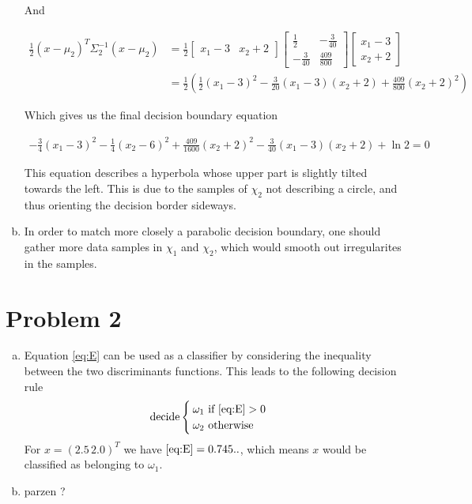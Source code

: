 \documentclass[a4paper, 10pt, twoside]{article}
\begin{document}
\begin{enumerate}[a)]
          And

          \begin{align*}
              \frac{1}{2} (x - \mu_2)^T \Sigma_2^{-1}(x - \mu_2)
               & =
              \frac{1}{2}
              \begin{bmatrix}x_1-3 & x_2+2\end{bmatrix}
              \begin{bmatrix}\frac{1}{2} & -\frac{3}{40} \\ -\frac{3}{40} & \frac{409}{800}\end{bmatrix}
              \begin{bmatrix}x_1-3 \\ x_2+2\end{bmatrix} \\
               & =
              \frac{1}{2}\left(\frac{1}{2}(x_1-3)^2 - \frac{3}{20}(x_1-3)(x_2+2)+\frac{409}{800}(x_2+2)^2\right)
          \end{align*}

          Which gives us the final decision boundary equation

          \begin{align}
              -\frac{3}{4} (x_1-3)^2 - \frac{1}{4} (x_2-6)^2 + \frac{409}{1600} (x_2+2)^2 - \frac{3}{40} (x_1-3)(x_2+2) + \ln 2 = 0 \label{eq:E}
          \end{align}

          This equation describes a hyperbola whose upper part is slightly tilted towards the left. This is due to the samples of $\chi_2$ not describing a circle, and thus orienting the decision border sideways.

    \item In order to match more closely a parabolic decision boundary, one should gather more data samples in $\chi_1$ and $\chi_2$, which would smooth out irregularites in the samples.

\end{enumerate}

\section*{Problem 2}
\begin{enumerate}[a)]
    \item Equation \eqref{eq:E} can be used as a classifier by considering the inequality between the two discriminants functions. This leads to the following decision rule
          \begin{align*}
              \text{decide}
              \begin{cases}
                  \omega_1 \text{ if \eqref{eq:E}} > 0 \\
                  \omega_2 \text{ otherwise}
              \end{cases}
          \end{align*}
          For $x = (2.5 \, 2.0)^T$ we have $\eqref{eq:E} = 0.745..$, which means $x$ would be classified as belonging to $\omega_1$.
          \item parzen ?
\end{enumerate}
\end{document}
